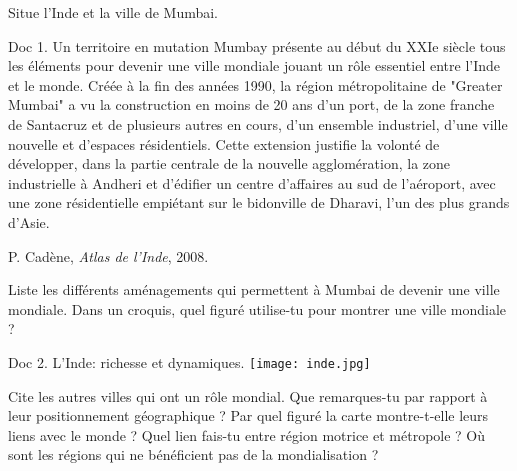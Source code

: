 \documentclass{beamer}
\begin{document}
\begin{frame}
Situe l'Inde et la ville de Mumbai.
\end{frame}

\begin{frame}
\begin{beamerboxesrounded}[scheme=blocimage]{Doc 1. Un territoire en mutation} 
Mumbay présente au début du XXIe siècle tous les éléments pour devenir une ville mondiale jouant un rôle essentiel entre l'Inde et le monde. Créée à la fin des années 1990, la région métropolitaine de "Greater Mumbai" a vu la construction en moins de 20 ans d'un port, de la zone franche de Santacruz et de plusieurs autres en cours, d'un ensemble industriel, d'une ville nouvelle et d'espaces résidentiels. Cette extension justifie la volonté de développer, dans la partie centrale de la nouvelle agglomération, la zone industrielle à Andheri et d'édifier un centre d'affaires au sud de l’aéroport, avec une zone résidentielle empiétant sur le bidonville de Dharavi, l'un des plus grands d'Asie.
\begin{flushright}
P. Cadène, \textit{Atlas de l'Inde}, 2008.
\end{flushright}
\end{beamerboxesrounded}
\end{frame}

\begin{frame}
Liste les différents aménagements qui permettent à Mumbai de devenir une ville mondiale. 
Dans un croquis, quel figuré utilise-tu pour montrer une ville mondiale ?
\end{frame}

\begin{frame}
\begin{beamerboxesrounded}[scheme=blocimage]{Doc 2. L'Inde: richesse et dynamiques.} 
\texttt{[image: inde.jpg]}
\end{beamerboxesrounded}
\end{frame}

\begin{frame}
Cite les autres villes qui ont un rôle mondial.
Que remarques-tu par rapport à leur positionnement géographique ?
Par quel figuré la carte montre-t-elle leurs liens avec le monde ?
Quel lien fais-tu entre région motrice et métropole ?
Où sont les régions qui ne bénéficient pas de la mondialisation ?

\end{frame}
\end{document}
